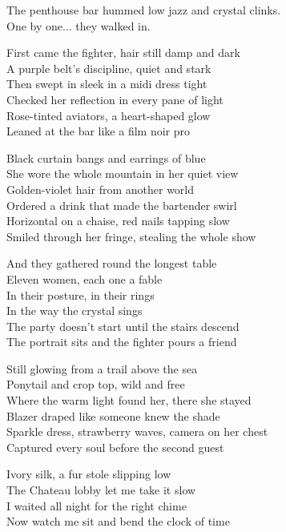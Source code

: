 \begin{lyrics}
The penthouse bar hummed low jazz and crystal clinks.\\
One by one... %
they walked in.

First came the fighter, hair still damp and dark\\
A purple belt's discipline, quiet and stark\\
Then swept in sleek in a midi dress tight\\
Checked her reflection in every pane of light\\
Rose-tinted aviators, a heart-shaped glow\\
Leaned at the bar like a film noir pro

Black curtain bangs and earrings of blue\\
She wore the whole mountain in her quiet view\\
Golden-violet hair from another world\\
Ordered a drink that made the bartender swirl\\
Horizontal on a chaise, red nails tapping slow\\
Smiled through her fringe, stealing the whole show

And they gathered round the longest table\\
Eleven women, each one a fable\\
In their posture, in their rings\\
In the way the crystal sings\\
The party doesn't start until the stairs descend\\
The portrait sits and the fighter pours a friend

Still glowing from a trail above the sea\\
Ponytail and crop top, wild and free\\
Where the warm light found her, there she stayed\\
Blazer draped like someone knew the shade\\
Sparkle dress, strawberry waves, camera on her chest\\
Captured every soul before the second guest

Ivory silk, a fur stole slipping low\\
The Chateau lobby let me take it slow\\
I waited all night for the right chime\\
Now watch me sit and bend the clock of time


\end{lyrics}
